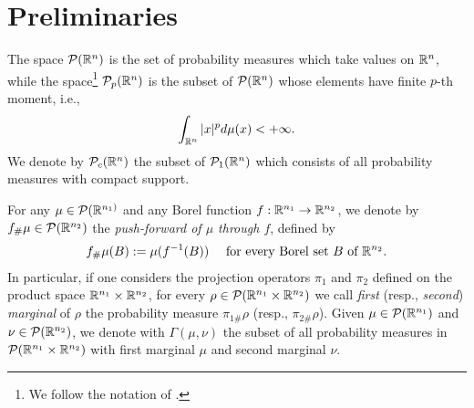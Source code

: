 
\section{Preliminaries}\label{meanfield}


The space $\mathcal{P}(\mathbb{R}^n)$ is the set of probability measures which take values on $\mathbb{R}^n$, while the space\footnote{We follow the notation of \cite{AGS}.} $\mathcal{P}_p(\mathbb{R}^n)$ is the subset of $\mathcal{P}(\mathbb{R}^n)$ whose elements have finite $p$-th moment, i.e.,
$$\int_{\mathbb{R}^n} |x|^p d\mu(x) < +\infty.$$
We denote by $\mathcal{P}_c(\mathbb{R}^n)$ the subset of $\mathcal{P}_1(\mathbb{R}^n)$ which consists of all probability measures with compact support. %

For any $\mu \in \mathcal{P}(\mathbb{R}^{n_1)}$ and any Borel function $f: \mathbb{R}^{n_1} \to \mathbb{R}^{n_2}$, we denote by $f_{\#}\mu \in \mathcal{P}(\mathbb{R}^{n_2})$ the {\it push-forward of $\mu$ through $f$}, defined by
\begin{align*}
f_{\#}\mu(B) := \mu(f^{-1}(B)) \quad \text{ for every Borel set } B \text{ of } \mathbb{R}^{n_2}.
\end{align*}
In particular, if one considers the projection operators $\pi_1$ and $\pi_2$ defined on the product space $\mathbb{R}^{n_1} \times \mathbb{R}^{n_2}$, for every $\rho \in \mathcal{P}(\mathbb{R}^{n_1} \times \mathbb{R}^{n_2})$ we call {\it first} (resp., {\it second}) {\it marginal} of $\rho$ the probability measure $\pi_{1\#}\rho$ (resp., $\pi_{2\#}\rho$). Given $\mu \in \mathcal{P}(\mathbb{R}^{n_1})$ and $\nu \in \mathcal{P}(\mathbb{R}^{n_2})$, we denote with $\Gamma(\mu, \nu)$ the subset of all probability measures in $\mathcal{P}(\mathbb{R}^{n_1} \times \mathbb{R}^{n_2})$ with first marginal $\mu$ and second marginal $\nu$.

